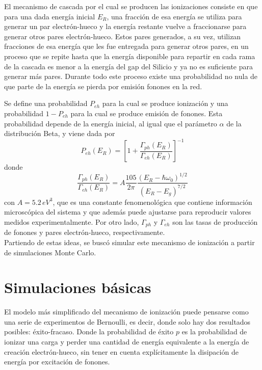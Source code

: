 \indent El mecanismo de cascada por el cual se producen las ionizaciones consiste en que para una dada energía inicial $E_{R}$, una fracción de esa energía se utiliza para generar un par electrón-hueco y la energía restante vuelve a fraccionarse para generar otros pares electrón-hueco. Estos pares generados, a su vez, utilizan fracciones de esa energía que les fue entregada para generar otros pares, en un proceso que se repite hasta que la energía disponible para repartir en cada rama de la cascada es menor a la energía del gap del Silicio y ya no es suficiente para generar más pares. Durante todo este proceso existe una probabilidad no nula de que parte de la energía se pierda por emisión fonones en la red.

Se define una probabilidad $P_{eh}$ para la cual se produce ionización y una probabilidad $1 - P_{eh}$ para la cual se produce emisión de fonones. Esta probabilidad depende de la energía inicial, al igual que el parámetro $\alpha$ de la distribución Beta, y viene dada por
\begin{equation}
    P_{eh}(E_{R}) = 
    \left[
        1 + \frac{\Gamma_{ph}(E_{R})}{\Gamma_{eh}(E_{R})}
    \right]^{-1}
        \label{ec:ProbabilidadIonizacion}
\end{equation}
donde 
\begin{equation*}
    \frac{\Gamma_{ph}(E_{R})}{\Gamma_{eh}(E_{R})}
    = A\frac{105}{2\pi}\frac{(E_{R} - \hbar \omega_{0})^{1/2}}{(E_{R} - E_{g})^{7/2}}
\end{equation*}
con $A = 5.2\,\si{eV^{3}}$, que es una constante fenomenológica que contiene información microscópica del sistema y que además puede ajustarse para reproducir valores medidos experimentalmente. Por otro lado, $\Gamma_{ph}$ y $\Gamma_{eh}$ son las tasas de producción de fonones y pares electrón-hueco, respectivamente.\\
\indent Partiendo de estas ideas, se buscó simular este mecanismo de ionización a partir de simulaciones Monte Carlo.
\section{Simulaciones básicas}
\noindent El modelo más simplificado del mecanismo de ionización puede pensarse como una serie de experimentos de Bernoulli, es decir, donde solo hay dos resultados posibles: éxito-fracaso. Donde la probabilidad de éxito $p$ es la probabilidad de ionizar una carga y perder una cantidad de energía equivalente a la energía de creación electrón-hueco, sin tener en cuenta explícitamente la disipación de energía por excitación de fonones.

